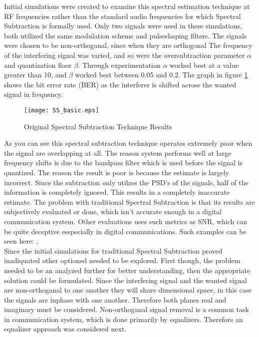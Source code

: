 Initial simulations were created to examine this spectral estimation technique at RF frequencies rather than the standard audio frequencies for which Spectral Subtraction is formally used.  Only two signals were used in these simulations, both utilized the same modulation scheme and pulseshaping filters.  The signals were chosen to be non-orthoganal, since when they are orthogonal The frequency of the interfering signal was varied, and so were the oversubtraction parameter \(\alpha\) and quantization floor \(\beta\).  Through experimentation \(\alpha\) worked best at a value greater than 10, and \(\beta\) worked best between 0.05 and 0.2.  The graph in figure \ref{SS_basic} shows the bit error rate (BER) as the interferer is shifted across the wanted signal in frequency.\\

\begin{figure}\label{SS_basic}
\centering
\texttt{[image: SS\_basic.eps]}
\caption{Original Spectral Subtraction Technique Results}
\end{figure} 

As you can see this spectral subtraction technique operates extremely poor when the signal are overlapping at all.  The reason system performs well at large frequency shifts is due to the bandpass filter which is used before the signal is quantized.  The reason the result is poor is because the estimate is largely incorrect.  Since the subtraction only utilzes the PSD's of the signals, half of the information is completely ignored.  This results in a completely inaccurate estimate.  The problem with traditional Spectral Subtraction is that its results are subjectively evaluated or done, which isn't accurate enough in a digital communication system.  Other evaluations uses such metrics as SNR, which can be quite deceptive esspecially in digital communications.  Such examples can be seen here: \cite{ss_subjective1}, \cite{ss_subjective2} \\

Since the initial simulations for traditional Spectral Subtraction proved inadiquated other optioned needed to be explored.  First though, the problem needed to be an analyzed further for better understanding, then the appropriate solution could be formulated.  Since the interfering signal and the wanted signal are non-orthoganal to one another they will share dimensional space, in this case the signals are inphase with one another.  Therefore both planes real and imaginary must be considered.  Non-orthoganal signal removal is a common task in communication system, which is done primarily by equalizers.  Therefore an equalizer approach was considered next.\\

